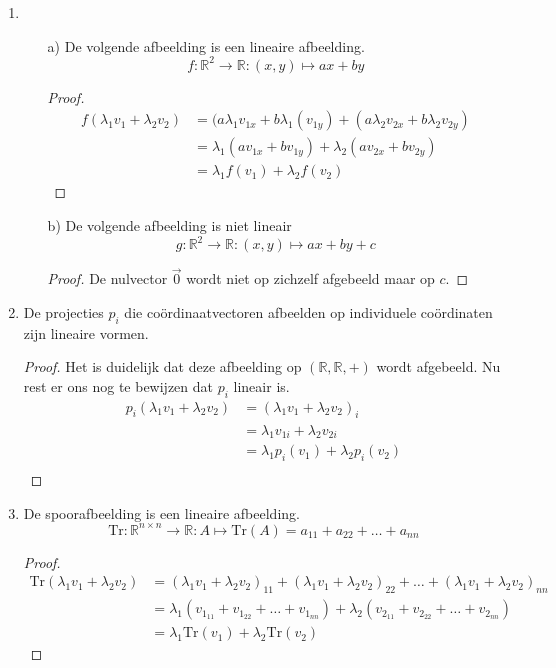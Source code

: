 \documentclass[lineaire_algebra_oplossingen.tex]{subfiles}
\begin{document}
\begin{enumerate}
\item
\begin{enumerate}
\item[a)]
De volgende afbeelding is een lineaire afbeelding.
\[f: \mathbb{R}^2 \rightarrow \mathbb{R}: (x,y) \mapsto ax+by\]
\begin{proof}
\begin{align*}
f(\lambda_1v_1+\lambda_2v_2)
&= (a\lambda_1v_{1x}+b\lambda_1(v_{1y})+(a\lambda_2v_{2x}+b\lambda_2v_{2y}) \\
&= \lambda_1(av_{1x}+bv_{1y})+\lambda_2(av_{2x}+bv_{2y})\\
&= \lambda_1f(v_1)+\lambda_2f(v_2)
\end{align*}
\end{proof}

\item[b)] De volgende afbeelding is niet lineair
\[g: \mathbb{R}^2 \rightarrow \mathbb{R}: (x,y) \mapsto ax+by+c\]
\begin{proof}
De nulvector $\vec{0}$ wordt niet op zichzelf afgebeeld maar op $c$.
\end{proof}
\end{enumerate}

\item De projecties $p_i$ die co\"ordinaatvectoren afbeelden op individuele co\"ordinaten zijn lineaire vormen.
\begin{proof}
Het is duidelijk dat deze afbeelding op $(\mathbb{R},\mathbb{R},+)$ wordt afgebeeld. Nu rest er ons nog te bewijzen dat $p_i$ lineair is.
\begin{align*}
p_i(\lambda_1v_1+\lambda_2v_2)
&= (\lambda_1v_1+\lambda_2v_2)_i \\
&= \lambda_1v_{1i}+\lambda_2v_{2i} \\
&= \lambda_1p_i(v_1)+\lambda_2p_i(v_2) \\
\end{align*}
\end{proof}

\item De spoorafbeelding is een lineaire afbeelding.
\[
\text{Tr}:\mathbb{R}^{n\times n}\rightarrow \mathbb{R}:A\mapsto \text{Tr}(A)=a_{11}+a_{22}+\ldots+a_{nn}
\]
\begin{proof}
\begin{align*}
\text{Tr}(\lambda_1v_1+\lambda_2v_2)
&= (\lambda_1v_1+\lambda_2v_2)_{11}+(\lambda_1v_1+\lambda_2v_2)_{22}+ \ldots+(\lambda_1v_1+\lambda_2v_2)_{nn}\\
&= \lambda_1 (v_{1_{11}}+v_{1_{22}}+\ldots+v_{1_{nn}}) + \lambda_2 (v_{2_{11}}+v_{2_{22}}+\ldots +v_{2_{nn}}) \\
&= \lambda_1\text{Tr}(v_1)+\lambda_2\text{Tr}(v_2)
\end{align*}
\end{proof}


\end{enumerate}
\end{document}
